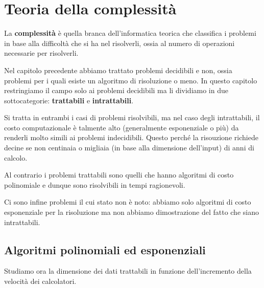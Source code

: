 \chapter{Teoria della complessit\`a}\label{complessita}
La \textbf{complessit\`a} \`e quella branca dell'informatica teorica che classifica i problemi in base alla
difficolt\`a che si ha nel risolverli, ossia al numero di operazioni necessarie per risolverli.

Nel capitolo precedente abbiamo trattato problemi decidibili e non, ossia problemi per i quali esiste un algoritmo
di risoluzione o meno. In questo capitolo restringiamo il campo solo ai problemi decidibili ma li dividiamo in due
sottocategorie: \textbf{trattabili} e \textbf{intrattabili}.

Si tratta in entrambi i casi di problemi risolvibili, ma nel caso degli intrattabili, il costo computazionale \`e
talmente alto (generalmente esponenziale o pi\`u) da renderli molto simili ai problemi indecidibili. Questo perch\'e
la risouzione richiede decine se non centinaia o migliaia (in base alla dimensione dell'input) di anni di calcolo.

Al contrario i problemi trattabili sono quelli che hanno algoritmi di costo polinomiale e dunque sono risolvibili in
tempi ragionevoli.

Ci sono infine problemi il cui stato non \`e noto: abbiamo solo algoritmi di costo esponenziale per la risoluzione ma
non abbiamo dimostrazione del fatto che siano intrattabili.

\section{Algoritmi polinomiali ed esponenziali}\label{alg_poly_exp}
Studiamo ora la dimensione dei dati trattabili in funzione dell'incremento della velocit\`a dei calcolatori.

